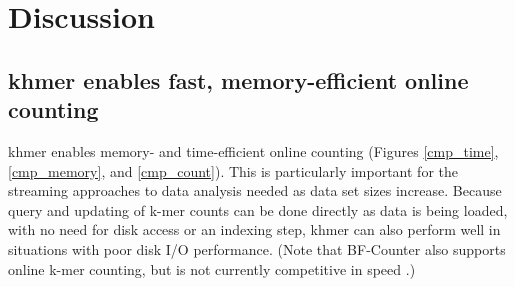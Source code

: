 \documentclass{article}
\begin{document}
\begin{table}[ht]
\caption{{\em E. coli} genome assembly after low-memory digital normalization.
  A comparison of assembling reads digitally normalized with low memory/high
  error rates.  We assembled digitally normalized reads using
  3-pass digital normalization (normalization to C=20, followed by
  low-abundance k-mer trimming, followed by normalization to C=5; see
  \cite{Brown2012} for more information) and measured total sequence recovered,
  as well as percent of true MG1655 genome covered by the assembly.}

\label{table:assembly}

\end{table}



\section{Discussion}

\subsection{khmer enables fast, memory-efficient online counting}

khmer enables memory- and time-efficient online counting (Figures \ref{cmp_time}, \ref{cmp_memory}, and \ref{cmp_count}).  This is
particularly important for the streaming approaches to data analysis
needed as data set sizes increase.  Because query and updating of
k-mer counts can be done directly as data is being loaded, with no
need for disk access or an indexing step, khmer can also perform
well in situations with poor disk I/O performance.  (Note that BF-Counter
also supports online k-mer counting, but is not currently competitive
in speed \cite{Deorowicz2013}.)
\end{document}
